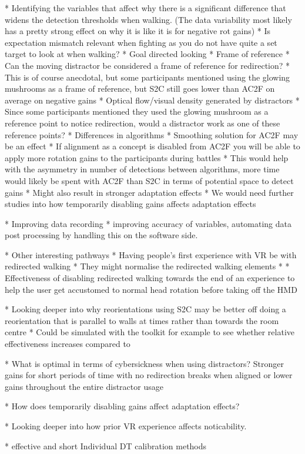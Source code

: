 * Identifying the variables that affect why there is a significant difference that widens the detection thresholds when walking. (The data variability most likely has a pretty strong effect on why it is like it is for negative rot gains)
   * Is expectation mismatch relevant when fighting as you do not have quite a set target to look at when walking?
      * Goal directed looking
   * Frame of reference
      * Can the moving distractor be considered a frame of reference for redirection?
      * This is of course anecdotal, but some participants mentioned using the glowing mushrooms as a frame of reference, but S2C still goes lower than AC2F on average on negative gains
      * Optical flow/visual density generated by distractors
         * Since some participants mentioned they used the glowing mushroom as a reference point to notice redirection, would a distractor work as one of these reference points?
   * Differences in algorithms
      * Smoothing solution for AC2F may be an effect
      * If alignment as a concept is disabled from AC2F you will be able to apply more rotation gains to the participants during battles
         * This would help with the asymmetry in number of detections between algorithms, more time would likely be spent with AC2F than S2C in terms of potential space to detect gains
         * Might also result in stronger adaptation effects
            * We would need further studies into how temporarily disabling gains affects adaptation effects

* Improving data recording
   * improving accuracy of variables, automating data post processing by handling this on the software side. 

* Other interesting pathways
   * Having people's first experience with VR be with redirected walking
      * They might normalise the redirected walking elements
         * 
   * Effectiveness of disabling redirected walking towards the end of an experience to help the user get accustomed to normal head rotation before taking off the HMD
   
   * Looking deeper into why reorientations using S2C may be better off doing a reorientation that is parallel to walls at times rather than towards the room centre
      * Could be simulated with the toolkit for example to see whether relative effectiveness increases compared to 
      
   * What is optimal in terms of cybersickness when using distractors? Stronger gains for short periods of time with no redirection breaks when aligned or lower gains throughout the entire distractor usage
   
   * How does temporarily disabling gains affect adaptation effects?
   
   * Looking deeper into how prior VR experience affects noticability. 
   
   * effective and short Individual DT calibration methods